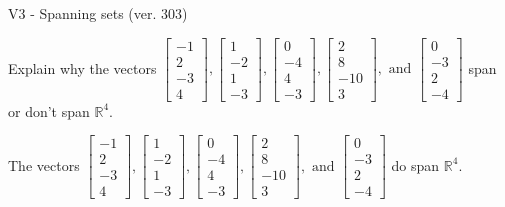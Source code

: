 \begin{exercise}
  \begin{exerciseTitle}V3 - Spanning sets (ver. 303)\end{exerciseTitle}
  \begin{exerciseStatement}
    Explain why the vectors \(\left[\begin{array}{r}
-1 \\
2 \\
-3 \\
4
\end{array}\right] , \left[\begin{array}{r}
1 \\
-2 \\
1 \\
-3
\end{array}\right] , \left[\begin{array}{r}
0 \\
-4 \\
4 \\
-3
\end{array}\right] , \left[\begin{array}{r}
2 \\
8 \\
-10 \\
3
\end{array}\right] , \text{ and } \left[\begin{array}{r}
0 \\
-3 \\
2 \\
-4
\end{array}\right]\) span or don't span \(\mathbb{R}^4\). 
	


  \end{exerciseStatement}
  \begin{exerciseAnswer}
   The vectors \(\left[\begin{array}{r}
-1 \\
2 \\
-3 \\
4
\end{array}\right] , \left[\begin{array}{r}
1 \\
-2 \\
1 \\
-3
\end{array}\right] , \left[\begin{array}{r}
0 \\
-4 \\
4 \\
-3
\end{array}\right] , \left[\begin{array}{r}
2 \\
8 \\
-10 \\
3
\end{array}\right] , \text{ and } \left[\begin{array}{r}
0 \\
-3 \\
2 \\
-4
\end{array}\right]\) 
  	 do  
	span \(\mathbb{R}^4\).
  



\end{exerciseAnswer}
\end{exercise}
